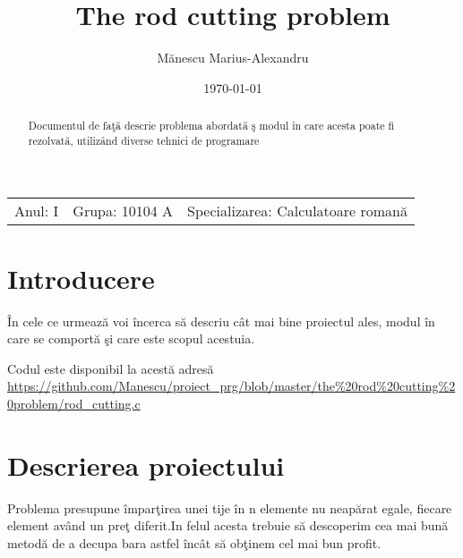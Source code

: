 \documentclass{article}
\begin{document}

\title{The rod cutting problem}
\author{M\u{a}nescu Marius-Alexandru}
\date{\today}
\maketitle

\begin{center}
\begin{tabular}{ c c c}

Anul: I \qquad & Grupa: 10104 A \qquad & Specializarea: Calculatoare roman\u{a}  \\ 
    
\end{tabular}
\end{center}


\newpage

\begin{abstract}
Documentul de fa\c{t}\u{a} descrie problema abordat\u{a} \c{s} modul \^in care acesta poate fi rezolvat\u{a}, utiliz\^and diverse tehnici de programare 
\end{abstract}

\section{Introducere}
 \par \qquad \^In cele ce urmeaz\u{a} voi \^incerca s\u{a} descriu c\^at mai bine proiectul ales, modul \^in care se comport\u{a} \c{s}i care este scopul acestuia.
 \newline
 \par \qquad Codul este disponibil la acest\u{a} adres\u{a} 
            \url{https://github.com/Manescu/proiect_prg/blob/master/the%20rod%20cutting%20problem/rod_cutting.c}
 
\section{Descrierea proiectului}
Problema presupune \^impar\c{t}irea unei tije \^in n elemente nu neap\u{a}rat egale, fiecare element av\^{a}nd un pre\c{t} diferit.In felul acesta trebuie s\u{a} descoperim cea mai bun\u{a} metod\u{a} de a decupa bara astfel \^inc\^at s\u{a} ob\c{t}inem cel mai bun profit.
\end{document}
